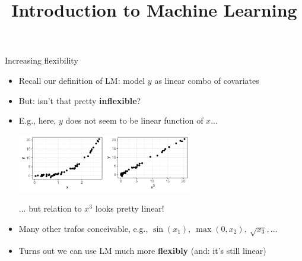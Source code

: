 \documentclass[11pt,compress,t,notes=noshow, xcolor=table]{beamer}
\title{Introduction to Machine Learning}
\institute{\href{https://compstat-lmu.github.io/lecture_i2ml/}{compstat-lmu.github.io/lecture\_i2ml}}
\date{}
\begin{document}


\begin{vbframe}{Increasing flexibility}

\begin{itemize}
    \item Recall our definition of LM: model $y$ as linear combo of covariates
    \item But: isn't that pretty \textbf{inflexible}?
    \item E.g., here, $y$ does not seem to be linear function of $x$... 

    \vspace{0.5cm}
    \includegraphics[width=0.6\textwidth]{figure/reg_poly_yx3.pdf} 
    
    ... but relation to $x^3$ looks pretty linear!
    
    \item Many other trafos conceivable, e.g., 
    $\sin(x_1), ~ \max(0, x_2), ~ \sqrt{x_3}, \dots$
    \item Turns out we can use LM much more 
    \textbf{flexibly} (and: it's still linear)
\end{itemize}

\end{vbframe}

\end{document}
